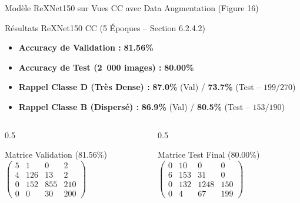 \documentclass[10pt, compress]{beamer}
\begin{document}
\begin{frame}{Modèle ReXNet150 sur Vues CC avec Data Augmentation (Figure 16)}
    \begin{block}{Résultats ReXNet150 CC (5 Époques -- Section 6.2.4.2)}
        \begin{itemize}
            \item \textbf{Accuracy de Validation :} \textbf{81.56\%}
            \item \textbf{Accuracy de Test (2~000 images) :} \textbf{80.00\%}
            \item \textbf{Rappel Classe D (Très Dense) :} \textbf{87.0\%} (Val) / \textbf{73.7\%} (Test -- $199/270$)
            \item \textbf{Rappel Classe B (Dispersé) :} \textbf{86.9\%} (Val) / \textbf{80.5\%} (Test -- $153/190$)
        \end{itemize}
    \end{block}

    \begin{columns}
        \begin{column}{0.5\textwidth}
            \begin{block}{Matrice Validation (81.56\%)}
                \small
                $\begin{pmatrix} 
                5 & 1 & 0 & 2 \\ 
                4 & 126 & 13 & 2 \\ 
                0 & 152 & 855 & 210 \\ 
                0 & 0 & 30 & 200 
                \end{pmatrix}$
            \end{block}
        \end{column}
        \begin{column}{0.5\textwidth}
            \begin{block}{Matrice Test Final (80.00\%)}
                \small
                $\begin{pmatrix} 
                0 & 10 & 0 & 0 \\ 
                6 & 153 & 31 & 0 \\ 
                0 & 132 & 1248 & 150 \\ 
                0 & 4 & 67 & 199 
                \end{pmatrix}$
            \end{block}
        \end{column}
    \end{columns}
\end{frame}
\end{document}
